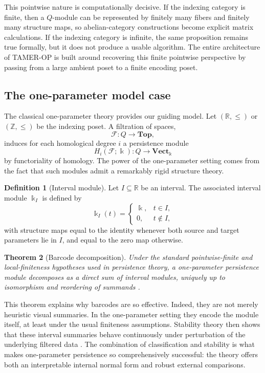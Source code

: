 \documentclass[11pt]{article}
\newcommand{\kk}{\Bbbk}
\newcommand{\TAMER}{\textsc{TAMER-OP}}
\newtheorem{theorem}{Theorem}
\theoremstyle{definition}
\newtheorem{defn}[theorem]{Definition}
\theoremstyle{remark}
\begin{document}
This pointwise nature is computationally decisive.  If the indexing category is finite, then a $Q$-module can be represented by finitely many fibers and finitely many structure maps, so abelian-category constructions become explicit matrix calculations.  If the indexing category is infinite, the same proposition remains true formally, but it does not produce a usable algorithm.  The entire architecture of \TAMER{} is built around recovering this finite pointwise perspective by passing from a large ambient poset to a finite encoding poset.

\subsection{The one-parameter model case}

The classical one-parameter theory provides our guiding model.  Let $(\mathbb{R},\leq)$ or $(\mathbb{Z},\leq)$ be the indexing poset.  A filtration of spaces,
\[
\mathcal{F}\colon Q\to \mathbf{Top},
\]
induces for each homological degree $i$ a persistence module
\[
H_i(\mathcal{F};\kk)\colon Q\to \mathbf{Vect}_{\kk}
\]
by functoriality of homology.  The power of the one-parameter setting comes from the fact that such modules admit a remarkably rigid structure theory.

\begin{defn}[Interval module]
Let $I\subseteq \mathbb{R}$ be an interval.  The associated interval module $\kk_I$ is defined by
\[
\kk_I(t)=
\begin{cases}
\kk, & t\in I,\\
0, & t\notin I,
\end{cases}
\]
with structure maps equal to the identity whenever both source and target parameters lie in $I$, and equal to the zero map otherwise.
\end{defn}

\begin{theorem}[Barcode decomposition]
Under the standard pointwise-finite and local-finiteness hypotheses used in persistence theory, a one-parameter persistence module decomposes as a direct sum of interval modules, uniquely up to isomorphism and reordering of summands \cite{CB15,Oud15}.
\end{theorem}

This theorem explains why barcodes are so effective.  Indeed, they are not merely heuristic visual summaries.  In the one-parameter setting they encode the module itself, at least under the usual finiteness assumptions.  Stability theory then shows that these interval summaries behave continuously under perturbation of the underlying filtered data \cite{CEH07,CDSGO16}.  The combination of classification and stability is what makes one-parameter persistence so comprehensively successful: the theory offers both an interpretable internal normal form and robust external comparisons.
\end{document}
